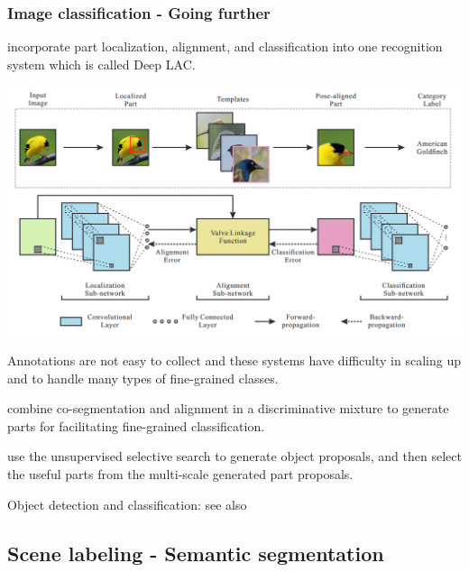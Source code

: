 \begin{frame}[allowframebreaks]
\frametitle{Image classification - Going further}


\cite{lin2015deep} incorporate part localization, alignment, and classification into one recognition system which is called Deep LAC.

\begin{center}
	\includegraphics[scale=0.5]{figs/Deep_LAC_structure}
\end{center}


\framebreak

Annotations are not easy to collect and these systems have difficulty in scaling up and to handle many types of fine-grained classes.

\bigskip

 combine co-segmentation and alignment in a discriminative mixture to generate parts for facilitating fine-grained classification.

\bigskip

 use the unsupervised selective search to generate object proposals, and then select the useful parts from the multi-scale generated part proposals.

\bigskip

Object detection and classification: see also 
\end{frame}



\subsection{Scene labeling - Semantic segmentation}

